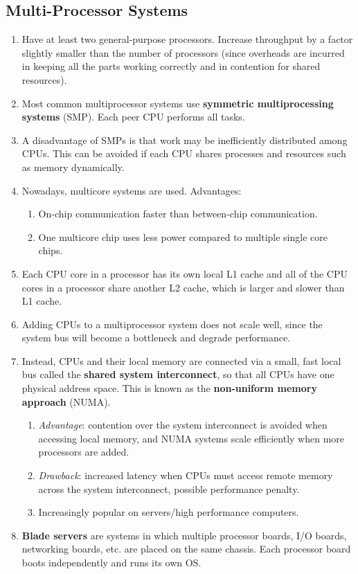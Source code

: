 \documentclass[journal,12pt,twocolumn]{IEEEtran}
\begin{document}
\subsection{Multi-Processor Systems}
\begin{enumerate}
    \item Have at least two general-purpose processors. Increase throughput by a 
    factor slightly smaller than the number of processors (since overheads are 
    incurred in keeping all the parts working correctly and in contention for 
    shared resources).
    \item Most common multiprocessor systems use \textbf{symmetric multiprocessing 
    systems} (SMP). Each peer CPU performs all tasks.
    \item A disadvantage of SMPs is that work may be inefficiently distributed 
    among CPUs. This can be avoided if each CPU shares processes and resources 
    such as memory dynamically.
    \item Nowadays, multicore systems are used. Advantages:
    \begin{enumerate}
        \item On-chip communication faster than between-chip communication.
        \item One multicore chip uses less power compared to multiple single 
        core chips.
    \end{enumerate}
    \item Each CPU core in a processor has its own local L1 cache and all of 
    the CPU cores in a processor share another L2 cache, which is larger and 
    slower than L1 cache.
    \item Adding CPUs to a multiprocessor system does not scale well, since the 
    system bus will become a bottleneck and degrade performance.
    \item Instead, CPUs and their local memory are connected via a small, fast 
    local bus called the \textbf{shared system interconnect}, so that all CPUs 
    have one physical address space. This is known as the \textbf{non-uniform 
    memory approach} (NUMA).
    \begin{enumerate}
        \item \textit{Advantage}: contention over the system interconnect is 
        avoided when accessing local memory, and NUMA systems scale efficiently 
        when more processors are added.
        \item \textit{Drawback}: increased latency when CPUs must access remote 
        memory across the system interconnect, possible performance penalty.
        \item Increasingly popular on servers/high performance computers.
    \end{enumerate}
    \item \textbf{Blade servers} are systems in which multiple processor boards, 
    I/O boards, networking boards, etc. are placed on the same chassis. Each 
    processor board boots independently and runs its own OS.
\end{enumerate}
\end{document}
